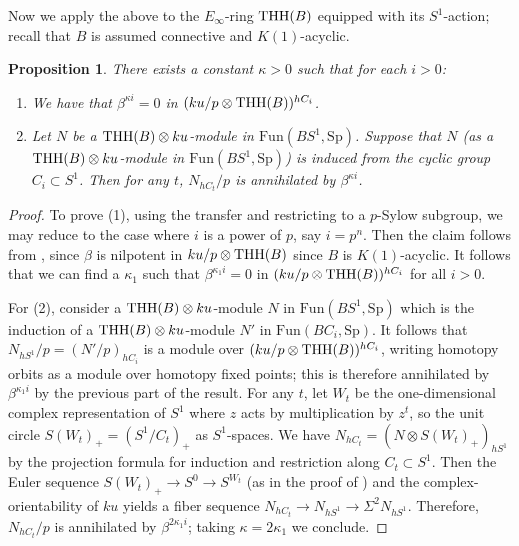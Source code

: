 \documentclass{amsart}
\renewcommand{\sp}{\mathrm{Sp}}
\newtheorem{proposition}[theorem]{Proposition}
\theoremstyle{definition}
\newcommand{\fun}{\mathrm{Fun}}
\begin{document}
Now we apply the above to the $E_\infty$-ring $\mathrm{THH}(B)$ equipped with its
$S^1$-action; recall that $B$ is assumed connective and $K(1)$-acyclic. 
\begin{proposition} 
\label{betanilpbound}
There exists a constant $\kappa >0$ such that for each $i > 0$: 
\begin{enumerate}
\item  
We have
that $\beta^{ \kappa i} =0$ in $(ku/p \otimes \mathrm{THH}(B))^{hC_{i}}$.
\item
Let $N$ be a $\mathrm{THH}(B) \otimes ku$-module in $\fun(BS^1, \sp)$. 
Suppose that $N$ (as a $\mathrm{THH}(B) \otimes ku$-module in $\fun(BS^1, \sp)$) is induced from
the cyclic group $C_i \subset S^1$. 
Then for any $t$, $N_{hC_t}/p $ is annihilated by $\beta^{\kappa i}$. 
\end{enumerate}
\end{proposition} 
\begin{proof} 
To prove (1), 
using the transfer and restricting to a $p$-Sylow subgroup, we may reduce to the case
where $i$ is a power of $p$, say $i = p^n$. 
Then the claim follows from , since $\beta$ is nilpotent in $ku/p
\otimes \mathrm{THH}(B)$ since $B$ is $K(1)$-acyclic. 
It follows that we can find a $\kappa_1$ such that $\beta^{\kappa_1 i} = 0$ in
$(ku/p \otimes \mathrm{THH}(B))^{hC_i}$ for all $i  > 0$. 

For (2), consider a $\mathrm{THH}(B) \otimes ku$-module $N$ in $\fun(BS^1, \sp)$ which is the induction
of 
a $\mathrm{THH}(B) \otimes ku$-module 
$N'$  in $ \fun(BC_{i}, \sp)$. 
It follows that $N_{hS^1} /p = (N' /p)_{hC_i} $ is a module over 
$(ku/p \otimes \mathrm{THH}(B))^{hC_i}$, writing homotopy orbits as a module over
homotopy fixed points; this is therefore annihilated by $\beta^{\kappa_1 i}$ by
the previous part of the result. 
For any $t$, let $W_t$ be the one-dimensional complex representation of $S^1$ where $z$ acts
by multiplication by $z^t$, so the unit circle $S(W_t)_+ = (S^1/C_t)_+$ as
$S^1$-spaces.
We have $N_{hC_t} = (N \otimes S(W_t)_+)_{hS^1}$ by the projection formula for
induction and restriction along $C_t \subset S^1$. 
Then the Euler sequence $S(W_t)_+ \to S^0 \to S^{W_t}$ (as
in the proof of ) and the complex-orientability of $ku$
yields a fiber sequence
$N_{h C_t}  \to N_{hS^1}  \to \Sigma^2 N_{hS^1} $. 
Therefore, $N_{hC_t} /p$ is annihilated by $\beta^{2 \kappa_1 i}$;
taking $\kappa = 2\kappa_1$ we conclude. 
\end{proof} 
\end{document}

